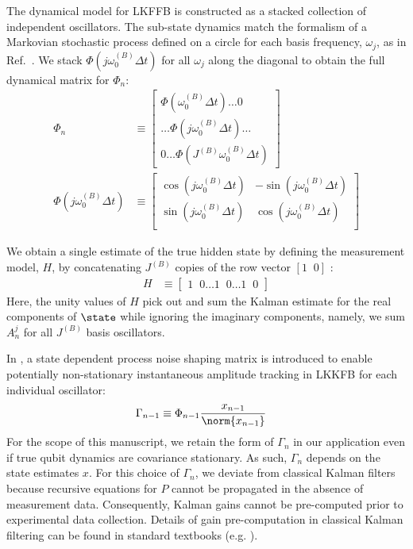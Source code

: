 The dynamical model for LKFFB is constructed as a stacked collection of independent oscillators. The sub-state dynamics match the formalism of a Markovian stochastic process defined on a circle for each basis frequency, $\omega_j$, as in Ref.~\cite{karlin2012first}. We stack $\Phi(j \omega_0^{(B)}\Delta t) $ for all $\omega_j$ along the diagonal to obtain the full dynamical matrix for $\Phi_n$:
\begin{align}
\Phi_{n} & \equiv \begin{bmatrix} 
\Phi(\omega_0^{(B)}\Delta t)\hdots 0  \\ 
 \hdots \Phi(j\omega_0^{(B)}\Delta t) \hdots \\
0 \hdots \Phi(J^{(B)} \omega_0^{(B)}\Delta t)  \end{bmatrix}\\ 
\Phi(j \omega_0^{(B)}\Delta t) &\equiv \begin{bmatrix} \cos(j \omega_0^{(B)}\Delta t) & -\sin(j \omega_0^{(B)}\Delta t) \\ \sin(j \omega_0^{(B)}\Delta t) & \cos(j \omega_0^{(B)}\Delta t) \\ \end{bmatrix} \label{eqn:ap_approxSP:LKFFB_Phi} 
\end{align}

We obtain a single estimate of the true hidden state by defining the measurement model, $H$, by concatenating $J^{(B)}$ copies of the row vector $[1\;\;0]$ :
\begin{align}
H & \equiv \begin{bmatrix} 1\;\;0 \hdots 1\;\;0 \hdots 1\;\;0 \end{bmatrix}
\end{align}
Here, the unity values of $H$ pick out and sum the Kalman estimate for the real components of $\state$ while ignoring the imaginary components, namely, we sum $A^{j}_{n}$ for all $J^{(B)}$ basis oscillators.

In \cite{livska2007}, a state dependent process noise shaping matrix is introduced to enable potentially non-stationary instantaneous amplitude tracking in LKKFB for each individual oscillator: 
\begin{align}
\Gamma_{n-1} &\equiv \Phi_{n-1}\frac{x_{n-1}}{\norm{x_{n-1}}}
\end{align}
For the scope of this manuscript, we retain the form of $\Gamma_{n}$ in our application even if true qubit dynamics are covariance stationary. As such, $\Gamma_{n}$ depends on the state estimates $x$. For this choice of $\Gamma_{n}$, we deviate from classical Kalman filters because recursive equations for $P$ cannot be propagated in the absence of measurement data. Consequently, Kalman gains cannot be pre-computed prior to experimental data collection. Details of gain pre-computation in classical Kalman filtering can be found in standard textbooks (e.g. \cite{grewal2001theory}).

